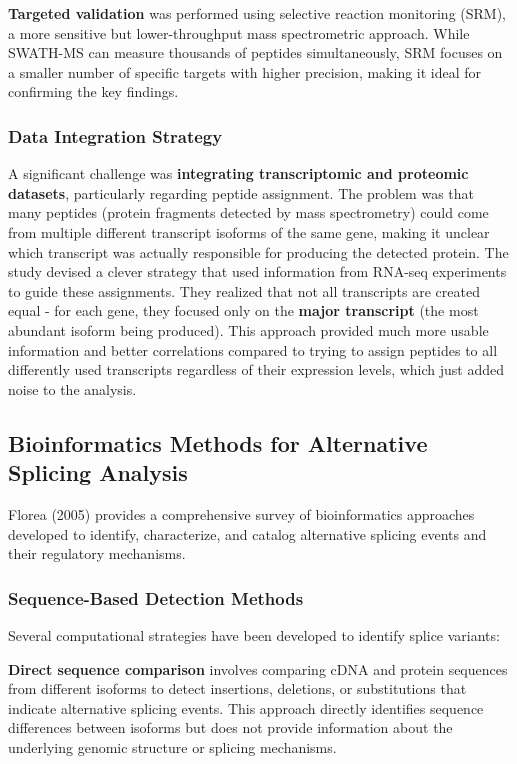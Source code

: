 \documentclass[12pt,a4paper]{article}
\begin{document}
\textbf{Targeted validation} was performed using selective reaction monitoring (SRM), a more sensitive but lower-throughput mass spectrometric approach. While SWATH-MS can measure thousands of peptides simultaneously, SRM focuses on a smaller number of specific targets with higher precision, making it ideal for confirming the key findings.

\subsubsection{Data Integration Strategy}

A significant challenge was \textbf{integrating transcriptomic and proteomic datasets}, particularly regarding peptide assignment. The problem was that many peptides (protein fragments detected by mass spectrometry) could come from multiple different transcript isoforms of the same gene, making it unclear which transcript was actually responsible for producing the detected protein. The study devised a clever strategy that used information from RNA-seq experiments to guide these assignments. They realized that not all transcripts are created equal - for each gene, they focused only on the \textbf{major transcript} (the most abundant isoform being produced). This approach provided much more usable information and better correlations compared to trying to assign peptides to all differently used transcripts regardless of their expression levels, which just added noise to the analysis.

\subsection{Bioinformatics Methods for Alternative Splicing Analysis}

Florea (2005) provides a comprehensive survey of bioinformatics approaches developed to identify, characterize, and catalog alternative splicing events and their regulatory mechanisms.

\subsubsection{Sequence-Based Detection Methods}

Several computational strategies have been developed to identify splice variants:

\textbf{Direct sequence comparison} involves comparing cDNA and protein sequences from different isoforms to detect insertions, deletions, or substitutions that indicate alternative splicing events. This approach directly identifies sequence differences between isoforms but does not provide information about the underlying genomic structure or splicing mechanisms.
\end{document}
